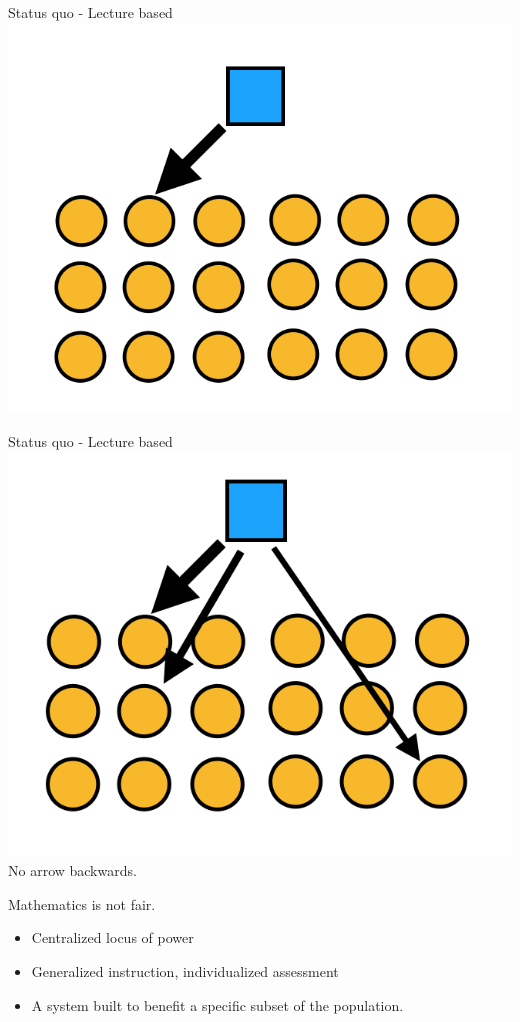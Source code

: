 \documentclass{beamer}
\begin{document}
\begin{frame}{Status quo - Lecture based}
  \centering
    \includegraphics[scale=0.5]{lecturestyle3}
\end{frame}
\begin{frame}{Status quo - Lecture based}
  \centering
    \includegraphics[scale=0.5]{lecturestyle2}\\
    \pause No arrow backwards.
\end{frame}
\begin{frame}{Mathematics is not fair.}
  \begin{itemize}
  \item Centralized locus of power
  \item Generalized instruction, individualized assessment\pause
  \item A system built to benefit a specific subset of the population.
  \end{itemize}
\end{frame}
\end{document}

